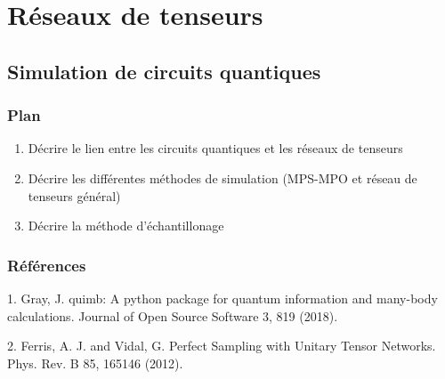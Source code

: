\begin{comment}
\end{comment}

\chapter{Réseaux de tenseurs}
\label{cha:reseaux-de-tenseurs}


\section{Simulation de circuits quantiques}

\subsection*{Plan}

\begin{enumerate}
    \item Décrire le lien entre les circuits quantiques et les réseaux de tenseurs
    \item Décrire les différentes méthodes de simulation (MPS-MPO et réseau de tenseurs général)
    \item Décrire la méthode d'échantillonage
\end{enumerate}

\subsection*{Références}

1. Gray, J. quimb: A python package for quantum information and many-body calculations. Journal of Open Source Software 3, 819 (2018).

2. Ferris, A. J. and Vidal, G. Perfect Sampling with Unitary Tensor Networks. Phys. Rev. B 85, 165146 (2012).


